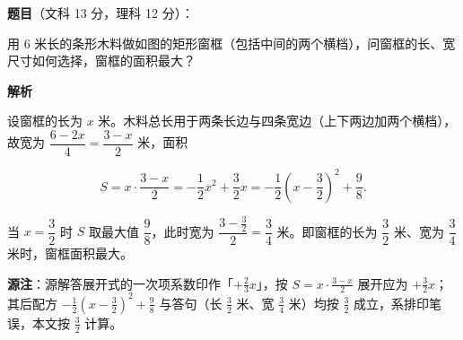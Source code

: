 \begin{answer}

\textbf{题目}（文科 13 分，理科 12 分）：

用 $6$ 米长的条形木料做如图的矩形窗框（包括中间的两个横档），问窗框的长、宽尺寸如何选择，窗框的面积最大？
\nopagebreak[4]
\begin{center}\end{center}
\nopagebreak[4]
\textbf{解析}
\nopagebreak[4]
\begin{center}\end{center}
\nopagebreak[4]
设窗框的长为 $x$ 米。木料总长用于两条长边与四条宽边（上下两边加两个横档），故宽为 $\dfrac{6-2x}{4}=\dfrac{3-x}{2}$ 米，面积

\nopagebreak[4]
\[
S=x\cdot\frac{3-x}{2}
=-\frac12x^2+\frac32x
=-\frac12\left(x-\frac32\right)^2+\frac98.
\]

当 $x=\dfrac32$ 时 $S$ 取最大值 $\dfrac98$，此时宽为 $\dfrac{3-\frac32}{2}=\dfrac34$ 米。即窗框的长为 $\dfrac32$ 米、宽为 $\dfrac34$ 米时，窗框面积最大。

\begin{gktip}
\textbf{源注}：源解答展开式的一次项系数印作「$+\frac23x$」，按 $S=x\cdot\frac{3-x}{2}$ 展开应为 $+\frac32x$；其后配方 $-\frac12\left(x-\frac32\right)^2+\frac98$ 与答句（长 $\frac32$ 米、宽 $\frac34$ 米）均按 $\frac32$ 成立，系排印笔误，本文按 $\frac32$ 计算。
\end{gktip}


\end{answer}
